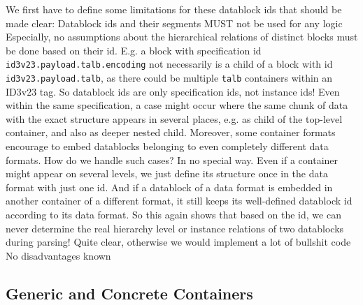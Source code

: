 We first have to define some limitations for these datablock ids that should be made clear:
{%
Datablock ids and their segments MUST not be used for any logic 
}
{%
Especially, no assumptions about the hierarchical relations of distinct blocks must be done based on their id. E.g. a block with specification id \texttt{id3v23.payload.talb.encoding} not necessarily is a child of a block with id \texttt{id3v23.payload.talb}, as there could be multiple \texttt{talb} containers within an ID3v23 tag. So datablock ids are only specification ids, not instance ids! Even within the same specification, a case might occur where the same chunk of data with the exact structure appears in several places, e.g. as child of the top-level container, and also as deeper nested child. Moreover, some container formats encourage to embed datablocks belonging to even completely different data formats. How do we handle such cases? In no special way. Even if a container might appear on several levels, we just define its structure once in the data format with just one id. And if a datablock of a data format is embedded in another container of a different format, it still keeps its well-defined datablock id according to its data format. So this again shows that based on the id, we can never determine the real hierarchy level or instance relations of two datablocks during parsing! 
}
{%
Quite clear, otherwise we would implement a lot of bullshit code
}
{%
No disadvantages known
}

\subsection{Generic and Concrete Containers}%
\label{sec:ConcreteandGenericContainers}%

